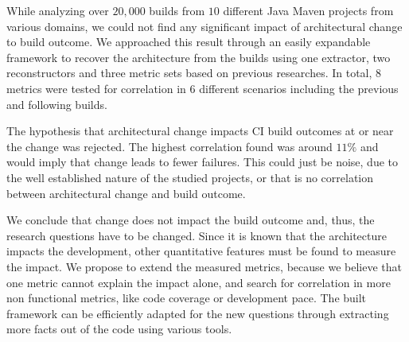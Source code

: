 \documentclass[conference]{IEEEtran}
\begin{document}
While analyzing over $20,000$ builds from $10$ different Java Maven projects from various domains, we could not find any significant impact of architectural change to build outcome.
We approached this result through an easily expandable framework to recover the architecture from the builds using one extractor, two reconstructors and three metric sets based on previous researches. In total, $8$ metrics were tested for correlation in $6$ different scenarios including the previous and following builds. 

The hypothesis that architectural change impacts CI build outcomes at or near the change was rejected. The highest correlation found was around $11\%$ and would imply that change leads to fewer failures. This could just be noise, due to the well established nature of the studied projects, or that is no correlation between architectural change and build outcome. 

We conclude that change does not impact the build outcome and, thus, the research questions have to be changed. Since it is known that the architecture impacts the development, other quantitative features must be found to measure the impact. We propose to extend the measured metrics, because we believe that one metric cannot explain the impact alone, and search for correlation in more non functional metrics, like code coverage or development pace.
The built framework can be efficiently adapted for the new questions through extracting more facts out of the code using various tools. 



\end{document}
